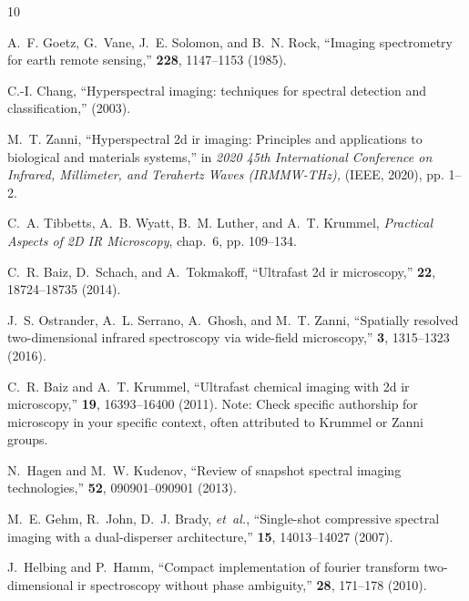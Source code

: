 \documentclass{optica-article}
\begin{document}
\begin{thebibliography}{10}
\newcommand{\enquote}[1]{``#1''}

A.~F. Goetz, G.~Vane, J.~E. Solomon, and B.~N. Rock, \enquote{Imaging spectrometry for earth remote sensing,} {\protect{}} \textbf{228}, 1147--1153 (1985).

C.-I. Chang, \enquote{Hyperspectral imaging: techniques for spectral detection and classification,} {\protect{}}  (2003).

M.~T. Zanni, \enquote{Hyperspectral 2d ir imaging: Principles and applications to biological and materials systems,} in \emph{2020 45th International Conference on Infrared, Millimeter, and Terahertz Waves (IRMMW-THz),}  (IEEE, 2020), pp. 1--2.

C.~A. Tibbetts, A.~B. Wyatt, B.~M. Luther, and A.~T. Krummel, \emph{Practical Aspects of 2D IR Microscopy}, chap.~6, pp. 109--134.

C.~R. Baiz, D.~Schach, and A.~Tokmakoff, \enquote{Ultrafast 2d ir microscopy,} {\protect{}} \textbf{22}, 18724--18735 (2014).

J.~S. Ostrander, A.~L. Serrano, A.~Ghosh, and M.~T. Zanni, \enquote{Spatially resolved two-dimensional infrared spectroscopy via wide-field microscopy,} {\protect{}} \textbf{3}, 1315--1323 (2016).

C.~R. Baiz and A.~T. Krummel, \enquote{Ultrafast chemical imaging with 2d ir microscopy,} {\protect{}} \textbf{19}, 16393--16400 (2011). Note: Check specific authorship for microscopy in your specific context, often attributed to Krummel or Zanni groups.

N.~Hagen and M.~W. Kudenov, \enquote{Review of snapshot spectral imaging technologies,} {\protect{}} \textbf{52}, 090901--090901 (2013).

M.~E. Gehm, R.~John, D.~J. Brady, \emph{et~al.}, \enquote{Single-shot compressive spectral imaging with a dual-disperser architecture,} {\protect{}} \textbf{15}, 14013--14027 (2007).

J.~Helbing and P.~Hamm, \enquote{Compact implementation of fourier transform two-dimensional ir spectroscopy without phase ambiguity,} {\protect{}} \textbf{28}, 171--178 (2010).


\end{thebibliography}
\end{document}
